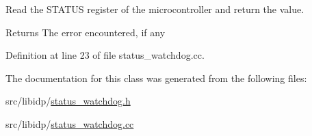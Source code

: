 Read the STATUS register of the microcontroller and return the value. 

\begin{DoxyReturn}{Returns}
The error encountered, if any 
\end{DoxyReturn}


Definition at line 23 of file status\_\-watchdog.cc.



The documentation for this class was generated from the following files:\begin{DoxyCompactItemize}
\item 
src/libidp/\hyperlink{status__watchdog_8h}{status\_\-watchdog.h}\item 
src/libidp/\hyperlink{status__watchdog_8cc}{status\_\-watchdog.cc}\end{DoxyCompactItemize}
